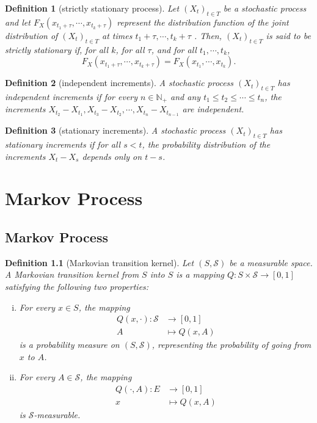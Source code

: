 \documentclass{report}
\newtheorem{definition}{Definition}[section]
\theoremstyle{nonumberplain}
\begin{document}
\begin{definition}[strictly stationary process]
	Let $(X_t)_{t\in T}$ be a stochastic process and let \newline $F_{{X}}(x_{{t_{1}+\tau }},\cdots ,x_{{t_{k}+\tau }})$ represent the  distribution function of the joint distribution of $(X_t)_{t\in T}$ at times $t_{1}+\tau ,\cdots ,t_{k}+\tau$ . Then, $(X_t)_{t\in T}$ is said to be strictly stationary if, for all $k$, for all $\tau$, and for all $ t_{1},\cdots ,t_{k}$,
	\[
	F_{{X}}(x_{{t_{1}+\tau }},\cdots ,x_{{t_{k}+\tau }})=F_{{X}}(x_{{t_{1}}},\cdots ,x_{{t_{k}}}).
	\]
\end{definition}

\begin{definition}[independent increments]
	A stochastic process $(X_t)_{t\in T}$ has \emph{independent increments} if for every $n\in \mathbb{N}_+$ and any $t_1\le t_2 \le\cdots\le t_n$, the increments $X_{t_2}-X_{t_1},X_{t_3}-X_{t_2},\cdots,X_{t_n}-X_{t_{n-1}}$ are independent.
\end{definition}

\begin{definition}[stationary increments]
	A stochastic process $(X_t)_{t\in T}$ has \emph{stationary increments} if for all $s<t$, the probability distribution of the increments $X_{t}-X_{s}$ depends only on $t-s$.
\end{definition}

\chapter{Markov Process}
\section{Markov Process}
\begin{definition}[Markovian transition kernel]
Let $(S, \mathcal{S})$ be a measurable space. A \emph{Markovian transition kernel} from $S$ into $S$ is a mapping $Q: S \times \mathcal{S} \longrightarrow[0,1]$ satisfying the following two properties:
\begin{enumerate}[(i)]
	\item For every $x \in S$, the mapping
	\begin{align*}
		Q(x, \cdot):\mathcal{S}&\longrightarrow [0,1]\\
		 A &\longmapsto Q(x, A)
	\end{align*}
	is a probability measure on $(S, \mathcal{S})$, representing the probability of going from $x$ to $A$.
	\item For every $A \in \mathcal{S}$, the mapping
	\begin{align*}
		Q(\cdot, A):E&\longrightarrow [0,1]\\
		x &\longmapsto Q(x, A)
	\end{align*}
	is $\mathcal{S}$-measurable.
\end{enumerate}
\end{definition}	
\end{document}
